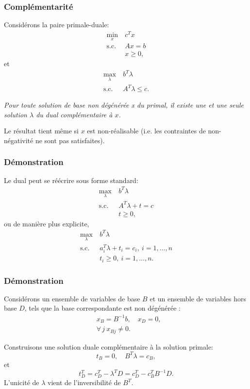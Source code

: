 \documentclass[usepdftitle=false]{beamer}
\begin{document}
\begin{frame}
	\frametitle{Complémentarité}
	
	Considérons la paire primale-duale:
	\begin{align*}
		\min_x\ & c^T x \\
		\mbox{s.c. } & Ax = b \\
		& x \geq 0,
	\end{align*}
	et
	\begin{align*}
		\max_{\lambda} \ & b^T \lambda \\
		\mbox{s.c. } & A^T \lambda \leq c.
	\end{align*}
	
	\textit{Pour toute solution de base non dégénérée x du primal, il existe une et une seule solution $\lambda$ du dual complémentaire à $x$.}
	
	Le résultat tient même si $x$ est non-réalisable (i.e. les contraintes de non-négativité ne sont pas satisfaites).
	
\end{frame}

\begin{frame}
	\frametitle{Démonstration}
	
	Le dual peut se réécrire sous forme standard:
	\begin{align*}
		\max_{\lambda} \ & b^T\lambda \\
		\mbox{s.c. } & A^T \lambda + t = c \\
		& t \geq 0,
	\end{align*}
	ou de manière plus explicite,
	\begin{align*}
		\max_{\lambda} \ & b^T\lambda \\
		\mbox{s.c. } & a_i^T \lambda + t_i = c_i,\ i = 1,\ldots,n \\
		& t_i \geq 0,\ i = 1,\ldots,n.
	\end{align*}
	
\end{frame}

\begin{frame}
	\frametitle{Démonstration}
	
	Considérons un ensemble de variables de base $B$ et un ensemble de variables hors base $D$, tels que la base correspondante est non dégénérée :
	\begin{align*}
		& x_B = B^{-1}b, \quad x_D = 0, \\
		& \forall\, j\ x_{Bj} \ne 0.
	\end{align*}
	
	Construisons une solution duale complémentaire à la solution primale:
	\[
	t_B = 0, \quad B^T\lambda = c_B,
	\]
	et
	$$
	t_D^T = c_D^T - \lambda^TD = c_D^T - c_B^TB^{-1}D.
	$$
	L'unicité de $\lambda$ vient de l'inversibilité de $B^T$.
	
\end{frame}
\end{document}
